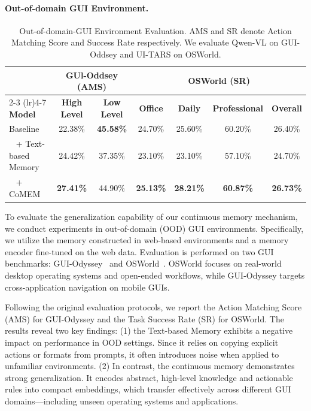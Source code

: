 \documentclass{article} %
\begin{document}
\paragraph{Out-of-domain GUI Environment.}
\begin{table}[h]
\centering
\caption{Out-of-domain-GUI Environment Evaluation. AMS and SR denote Action Matching Score and Success Rate respectively. We evaluate Qwen-VL on GUI-Oddsey and UI-TARS on OSWorld.}
\vspace{-0.5em}
\small
\begin{tabular}{lcccccc}
\toprule
& \multicolumn{2}{c}{\textbf{GUl-Oddsey} (AMS) } & \multicolumn{4}{c}{\textbf{OSWorld} (SR)} \\
\cmidrule(lr){2-3} \cmidrule(lr){4-7}
\textbf{Model} & \textbf{High Level} & \textbf{Low Level} & \textbf{Office} & \textbf{Daily} & \textbf{Professional} & \textbf{Overall} \\
\midrule
Baseline & 22.38\% & \textbf{45.58\%} & 24.70\% & 25.60\% & 60.20\% & 26.40\% \\
~ + Text-based Memory & 24.42\% & 37.35\% & 23.10\% & 23.10\% & 57.10\% & 24.70\%\\
~ + CoMEM & \textbf{27.41\%} & 44.90\% & \textbf{25.13\%} &	\textbf{28.21\%} &	\textbf{60.87\%} & \textbf{26.73\%} \\
\bottomrule
\end{tabular}
\label{tab:OOD-GUI}
\end{table}

To evaluate the generalization capability of our continuous memory mechanism, we conduct experiments in out-of-domain (OOD) GUI environments. Specifically, we utilize the memory constructed in web-based environments and a memory encoder fine-tuned on the web data. Evaluation is performed on two GUI benchmarks: GUI-Odyssey~\citep{guiodyssey} and OSWorld~\citep{osworld}. OSWorld focuses on real-world desktop operating systems and open-ended workflows, while GUI-Odyssey targets cross-application navigation on mobile GUIs.

Following the original evaluation protocols, we report the Action Matching Score (AMS) for GUI-Odyssey and the Task Success Rate (SR) for OSWorld. The results reveal two key findings: (1) the Text-based Memory exhibits a negative impact on performance in OOD settings. Since it relies on copying explicit actions or formats from prompts, it often introduces noise when applied to unfamiliar environments. (2) In contrast, the continuous memory demonstrates strong generalization. It encodes abstract, high-level knowledge and actionable rules into compact embeddings, which transfer effectively across different GUI domains—including unseen operating systems and applications.
\end{document}

